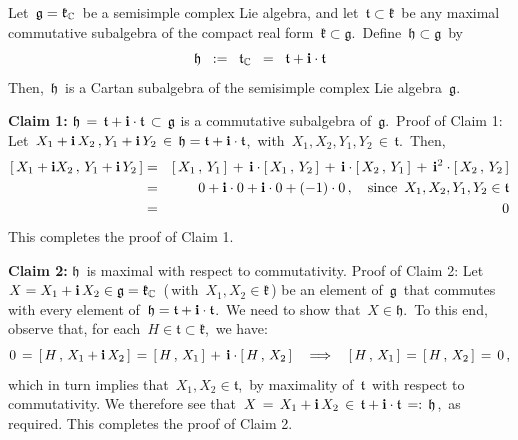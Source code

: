 \vskip 0.5cm
\begin{proposition}
\mbox{}
\vskip 0.05cm
\noindent
Let \,$\mathfrak{g} = \mathfrak{k}_{\mathbb{C}}$\, be a semisimple complex Lie algebra,
and let \,$\mathfrak{t} \subset \mathfrak{k}$\,
be any {\color{red}maximal commutative subalgebra}
of the compact real form \,$\mathfrak{k} \subset \mathfrak{g}$.\,
Define \,$\mathfrak{h} \subset \mathfrak{g}$\, by
\begin{equation*}
\mathfrak{h} \;\; := \;\; \mathfrak{t}_{\mathbb{C}} \;\; = \;\; \mathfrak{t} + \mathbf{i}\cdot\mathfrak{t}
\end{equation*}
Then, \,$\mathfrak{h}$\, is a Cartan subalgebra of the semisimple complex Lie algebra \,$\mathfrak{g}$.\,
\end{proposition}
\proof
\vskip 0.1cm
\noindent
\textbf{Claim 1:}\;\; $\mathfrak{h} \,=\, \mathfrak{t} + \mathbf{i}\cdot\mathfrak{t} \,\subset\, \mathfrak{g}$
is a commutative subalgebra of \,$\mathfrak{g}$.\,
\vskip 0.1cm
\noindent
Proof of Claim 1:\;
Let \,$X_{1} + \mathbf{i}\,X_{2}\,, Y_{1} + \mathbf{i}\,Y_{2} \,\in\, \mathfrak{h} = \mathfrak{t} + \mathbf{i}\cdot\mathfrak{t}$,\,
with
\,$X_{1}, X_{2}, Y_{1}, Y_{2} \,\in\, \mathfrak{t}$.\,
Then,
\begin{eqnarray*}
\left[\,X_{1} + \mathbf{i} X_{2}\,,\,Y_{1} + \mathbf{i}\,Y_{2}\,\right]
& = &
    \left[\,X_{1}\,,\,Y_{1}\,\right]
    \, + \,
    \mathbf{i}\cdot\left[\,X_{1}\,,\,Y_{2}\,\right]
    \, + \,
    \mathbf{i}\cdot\left[\,X_{2}\,,\,Y_{1}\,\right]
    \, + \,
    \mathbf{i}^{2}\cdot\left[\,X_{2}\,,\,Y_{2}\,\right]
\\
& = &
    0 + \mathbf{i}\cdot0 + \mathbf{i}\cdot0 + (-1)\cdot0\,,
    \quad
    \textnormal{since \,$X_{1}, X_{2}, Y_{1}, Y_{2} \in \mathfrak{t}$}
\\
& = &
    0
\end{eqnarray*}
This completes the proof of Claim 1.

\vskip 0.3cm
\noindent
\textbf{Claim 2:}\;\; $\mathfrak{h}$\, is maximal with respect to commutativity.
\vskip 0.1cm
\noindent
Proof of Claim 2:\;
Let
\,$X = X_{1} + \mathbf{i}\,X_{2} \in \mathfrak{g} = \mathfrak{k}_{\mathbb{C}}$\,
(\,with \,$X_{1}, X_{2} \in \mathfrak{k}$\,)
be an element of \,$\mathfrak{g}$\, that commutes with every element of
\,$\mathfrak{h} = \mathfrak{t} + \mathbf{i}\cdot\mathfrak{t}$.\,
We need to show that \,$X \in \mathfrak{h}$.\,
To this end, observe that, for each
\,$H \in \mathfrak{t} \subset \mathfrak{k}$,\, we have:
\begin{equation*}
0
\, = \,
    \left[\,H\,,\,X_{1}+\mathbf{i}\,X_{2}\,\right]
\, = \,
    \left[\,H\,,\,X_{1}\,\right]
    \, + \,
    \mathbf{i}\cdot\left[\,H\,,\,X_{2}\,\right]
\quad\Longrightarrow\quad
    \left[\,H\,,\,X_{1}\,\right]
    \,=\,
    \left[\,H\,,\,X_{2}\,\right]
    \,=\,
    0\,,
\end{equation*}
which in turn implies that
\,$X_{1}, X_{2} \in \mathfrak{t}$,\,
by maximality of \,$\mathfrak{t}$\, with respect to commutativity.
We therefore see that
\,$X \,=\, X_{1} + \mathbf{i}\,X_{2} \,\in\, \mathfrak{t} + \mathbf{i}\cdot\mathfrak{t} \,=:\, \mathfrak{h}$,\,
as required.
This completes the proof of Claim 2.

